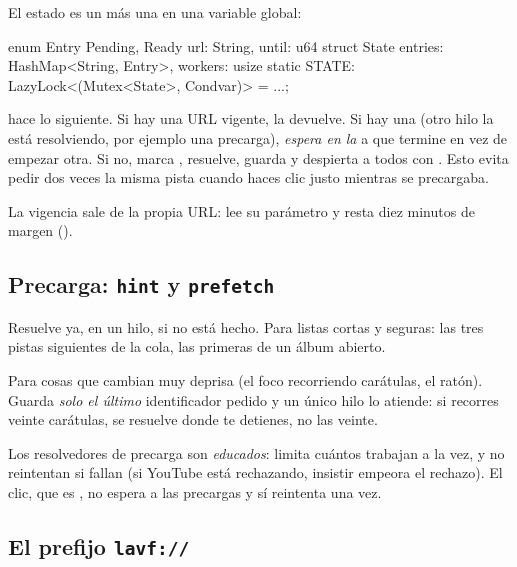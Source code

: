 El estado es un  más una  en una variable global:

\begin{rust}
enum Entry { Pending, Ready { url: String, until: u64 } }
struct State { entries: HashMap<String, Entry>, workers: usize }
static STATE: LazyLock<(Mutex<State>, Condvar)> = ...;
\end{rust}

 hace lo siguiente. Si hay una URL  vigente, la devuelve. Si hay
una  (otro hilo la está resolviendo, por ejemplo una precarga), \emph{espera en la
} a que termine en vez de empezar otra. Si no, marca , resuelve,
guarda  y despierta a todos con . Esto evita pedir dos veces la
misma pista cuando haces clic justo mientras se precargaba.

La vigencia sale de la propia URL:  lee su parámetro  y resta
diez minutos de margen ().

\subsection{Precarga: \texttt{hint} y \texttt{prefetch}}

\begin{description}[style=nextline, leftmargin=0pt]
  \item[\cod{prefetch(id)}] Resuelve ya, en un hilo, si no está hecho. Para listas cortas y
  seguras: las tres pistas siguientes de la cola, las primeras de un álbum abierto.
  \item[\cod{hint(id)}] Para cosas que cambian muy deprisa (el foco recorriendo carátulas, el
  ratón). Guarda \emph{solo el último} identificador pedido y un único hilo lo atiende: si
  recorres veinte carátulas, se resuelve donde te detienes, no las veinte.
\end{description}

Los resolvedores de precarga son \emph{educados}:  limita cuántos
trabajan a la vez, y no reintentan si fallan (si YouTube está rechazando, insistir empeora el
rechazo). El clic, que es , no espera a las precargas y sí reintenta una vez.

\subsection{El prefijo \texttt{lavf://}}


